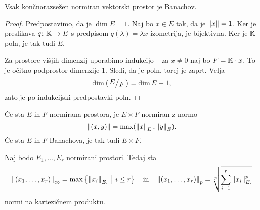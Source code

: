 \begin{posledica}
Vsak končnorazsežen normiran vektorski prostor je Banachov.
\end{posledica}

\begin{proof}
Predpostavimo, da je $\dim E = 1$. Naj bo $x \in E$ tak, da je
$\left\lVert x\right\rVert = 1$. Ker je preslikava $q \colon \mathbb{K} \to E$ s predpisom
$q(\lambda) = \lambda x$ izometrija, je bijektivna. Ker je $\mathbb{K}$
poln, je tak tudi $E$.

Za prostore višjih dimenzij uporabimo indukcijo -- za $x \ne 0$ naj
bo $F = \mathbb{K} \cdot x$. To je očitno podprostor dimenzije $1$. Sledi,
da je poln, torej je zaprt. Velja
\[
\dim \left(\kvoc{E}{F}\right) = \dim E - 1,
\]
zato je po indukcijski predpostavki poln.
\end{proof}

\begin{zgled}
Če sta $E$ in $F$ normirana prostora, je $E \times F$ normiran z
normo
\[
\left\lVert (x,y)\right\rVert = \max(\left\lVert x\right\rVert_E, \left\lVert y\right\rVert_E).
\]
Če sta $E$ in $F$ Banachova, je tak tudi $E \times F$.
\end{zgled}

\begin{zgled}
Naj bodo $E_1, \dots, E_r$ normirani prostori. Tedaj sta
\[
\left\lVert (x_1, \dots, x_r)\right\rVert_\infty =
\max \left\{\left\lVert x_i\right\rVert_{E_i}~\middle\vert~i \leq r\right\}
\quad \text{in} \quad
\left\lVert (x_1, \dots, x_r)\right\rVert_p =
\sqrt[p]{\sum_{i=1}^r \left\lVert x_i\right\rVert_{E_i}^p}
\]
normi na kartezičnem produktu.
\end{zgled}
